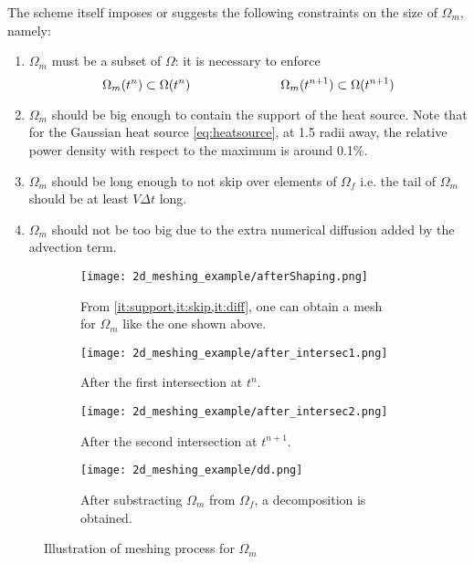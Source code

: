 The scheme itself imposes or suggests  the following
constraints on the size of $\Omega_m$, namely:
\begin{enumerate}
  \item\label{it:subset} $\Omega_m$ must be a subset of $\Omega$: it is necessary
    to enforce
    \begin{equation}\label{eq:subset}
      \Omega_m ( t^n ) \subset \Omega ( t^n )
      \hspace{2.5cm}
      \Omega_m ( t^{n+1} ) \subset \Omega ( t^{n+1} )
    \end{equation}
  \item\label{it:support} $\Omega_m$ should be big enough to contain the support
    of the heat source. Note that for the Gaussian heat
    source \eqref{eq:heatsource}, \enskip 
    at 1.5 radii away, the relative power density with respect
    to the maximum is around 0.1\%.
  \item\label{it:skip} $\Omega_m$ should be long enough to not skip over elements
    of $\Omega_f$ i.e. the tail of $\Omega_m$ should be at least
    $V \Delta t$ long.
  \item\label{it:diff} $\Omega_m$ should not be too big due to the extra numerical
    diffusion added by the advection term.
\end{enumerate}

\begin{figure}[h]
  \begin{subfigure}[t]{0.49\textwidth}
    \texttt{[image: 2d\_meshing\_example/afterShaping.png]}
    \caption{From \cref{it:support,it:skip,it:diff}, one can obtain
    a mesh for $\Omega_m$ like the one shown above.}
  \end{subfigure}
  \hfill%
  \begin{subfigure}[t]{0.49\textwidth}
    \texttt{[image: 2d\_meshing\_example/after\_intersec1.png]}
    \caption{After the first intersection at $t^n$.}
  \end{subfigure}
  \begin{subfigure}[t]{0.49\textwidth}
    \texttt{[image: 2d\_meshing\_example/after\_intersec2.png]}
    \caption{After the second intersection at $t^{n+1}$.}
  \end{subfigure}
  \hfill%
  \begin{subfigure}[t]{0.49\textwidth}
    \texttt{[image: 2d\_meshing\_example/dd.png]}
    \caption{After substracting $\Omega_m$ from $\Omega_f$, a decomposition
    is obtained.}
  \end{subfigure}
  \caption{Illustration of meshing process for $\Omega_m$}
  \label{fig:2d_meshing_example}
\end{figure}

